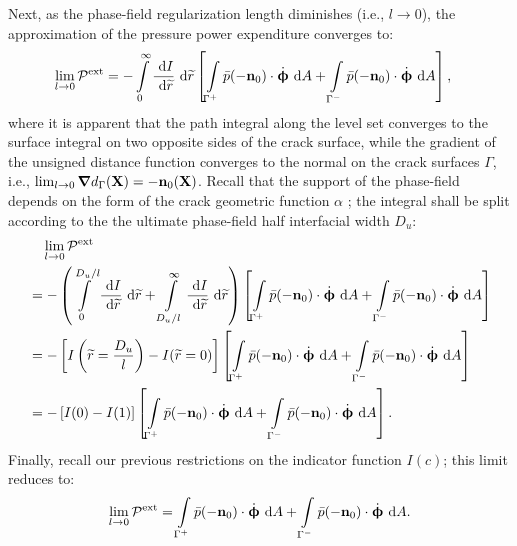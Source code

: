 Next, as the phase-field regularization length diminishes (i.e., $l \to 0$), the approximation of the pressure power expenditure converges to:
\begin{subequations}
  \begin{align}
    \lim_{l \to 0} \mathcal{P}^\text{ext} & = - \int\limits_0^\infty \dfrac{\text{ d}I}{\text{ d}\widetilde{r}} \text{ d}\widetilde{r} \left[ \int\limits_{\Gamma^+} \bar{p} (-\textbf{n}_0) \cdot \dot{\boldsymbol{\upphi}} \text{ d}A + \int\limits_{\Gamma^-} \bar{p} (-\textbf{n}_0) \cdot \dot{\boldsymbol{\upphi}} \text{ d}A \right] , 
  \end{align}
\end{subequations}
where it is apparent that the path integral along the level set converges to the surface integral on two opposite sides of the crack surface, while the gradient of the unsigned distance function converges to the normal on the crack surfaces $\Gamma$, i.e., $\lim_{l \to 0} \boldsymbol{\nabla} d_\Gamma(\textbf{X}) = -\textbf{n}_0(\textbf{X})$. Recall that the support of the phase-field depends on the form of the crack geometric function $\alpha$ \cite{JYWu2017}; the integral shall be split according to the the ultimate phase-field half interfacial width $D_u$:
\begin{equation}
  \begin{aligned}
     & \quad \lim_{l \to 0} \mathcal{P}^\text{ext}                                                                                                                                                                                                                                                                                                            \\
     & = - \left( \int\limits_0^{D_u/l} \dfrac{\text{ d}I}{\text{ d}\widetilde{r}} \text{ d}\widetilde{r} + \int\limits_{D_u/l}^\infty \dfrac{\text{ d}I}{\text{ d}\widetilde{r}} \text{ d}\widetilde{r} \right) \left[ \int\limits_{\Gamma^+} \bar{p} (-\textbf{n}_0) \cdot \dot{\boldsymbol{\upphi}} \text{ d}A + \int\limits_{\Gamma^-} \bar{p} (-\textbf{n}_0) \cdot \dot{\boldsymbol{\upphi}} \text{ d}A \right] \\
     & = - \left[ I\left( \widetilde{r}=\dfrac{D_u}{l} \right) - I(\widetilde{r}=0) \right] \left[ \int\limits_{\Gamma^+} \bar{p} (-\textbf{n}_0) \cdot \dot{\boldsymbol{\upphi}} \text{ d}A + \int\limits_{\Gamma^-} \bar{p} (-\textbf{n}_0) \cdot \dot{\boldsymbol{\upphi}} \text{ d}A \right]                                                                                                          \\
     & = - \left[ I(0) - I(1) \right] \left[ \int\limits_{\Gamma^+} \bar{p} (-\textbf{n}_0) \cdot \dot{\boldsymbol{\upphi}} \text{ d}A + \int\limits_{\Gamma^-} \bar{p} (-\textbf{n}_0) \cdot \dot{\boldsymbol{\upphi}} \text{ d}A \right].                                                                                                                                                               
  \end{aligned}
\end{equation}
Finally, recall our previous restrictions on the indicator function $I(c)$; this limit reduces to:
\begin{align}
  \lim_{l \to 0} \mathcal{P}^\text{ext} = \int\limits_{\Gamma^+} \bar{p} (-\textbf{n}_0) \cdot \dot{\boldsymbol{\upphi}} \text{ d}A + \int\limits_{\Gamma^-} \bar{p} (-\textbf{n}_0) \cdot \dot{\boldsymbol{\upphi}} \text{ d}A.
\end{align}

